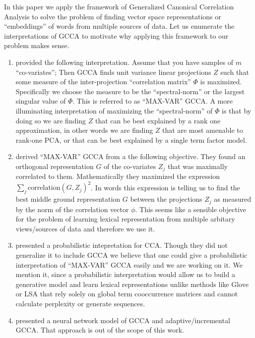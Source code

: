 \documentclass[11pt]{article}
\begin{document}
In this paper we apply the framework of Generalized Canonical
Correlation Analysis to solve the problem of finding vector space
representations or ``embeddings'' of words from multiple sources of
data. Let us enumerate the interpretations of GCCA to motivate why applying this
framework to our problem makes sense.
\begin{enumerate}[leftmargin=*]
\item \cite{horst1961generalized} provided the following
  interpretation. Assume that you have samples of $m$
  ``co-variates''; Then GCCA finds unit variance linear
  projections $Z$ such that some measure of the inter-projection ``correlation
  matrix'' $\Phi$ is maximized. Specifically we choose the measure to be
  the ``spectral-norm'' or the largest singular value of $\Phi$. This
  is referred to as ``MAX-VAR'' GCCA. A more illuminating
  interpretation of maximizing the ``spectral-norm'' of $\Phi$ is that
  by doing so we are finding $Z$ that can be best explained by a rank
  one approximation, in other words we are finding $Z$ that are most
  amenable to rank-one PCA, or that can be best explained by a single
  term factor model.
\item \cite{carroll1968generalization} derived ``MAX-VAR'' GCCA from a
  the following objective. They found an orthogonal
  representation $G$ of the co-variates $Z_j$ that was maximally
  correlated to them. Mathematically they maximized
   the expression $\sum_j \textrm{correlation}(G, Z_j)^2$. In words
   this expression is telling us to find the best middle ground
   representation $G$ between the projections $Z_j$ as measured by the
   norm of the correlation vector $\phi$. This seems like a sensible
   objective for the problem of learning lexical representation from
   multiple arbitary views/sources of data and therefore
   we use it.
\item \cite{bach2005probabilistic} presented a probabilistic
  intepretation for CCA. Though they did not generalize it to
  include GCCA we believe that one could give a probabilistic
  interpretation of ``MAX-VAR'' GCCA easily and we are working on
  it. We mention it, since a probabilistic
  interpretation would allow us to build a generative model and learn
  lexical representations unlike methods like Glove or LSA that rely
  solely on global term cooccurrence matrices and cannot calculate
  perplexity or generate sequences.
\item \cite{via2007learning} presented a neural network model of GCCA and
  adaptive/incremental GCCA. That approach is out of the scope of this work.
\end{enumerate}
\end{document}
